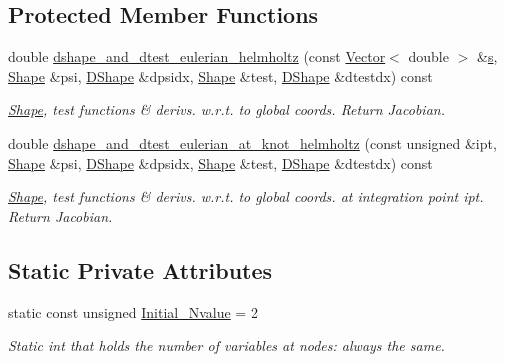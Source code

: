 \subsection*{Protected Member Functions}
\begin{DoxyCompactItemize}
\item 
double \hyperlink{classoomph_1_1QPMLHelmholtzElement_a0d5e590e5bd51ba8d2331c6fdced4653}{dshape\+\_\+and\+\_\+dtest\+\_\+eulerian\+\_\+helmholtz} (const \hyperlink{classoomph_1_1Vector}{Vector}$<$ double $>$ \&\hyperlink{cfortran_8h_ab7123126e4885ef647dd9c6e3807a21c}{s}, \hyperlink{classoomph_1_1Shape}{Shape} \&psi, \hyperlink{classoomph_1_1DShape}{D\+Shape} \&dpsidx, \hyperlink{classoomph_1_1Shape}{Shape} \&test, \hyperlink{classoomph_1_1DShape}{D\+Shape} \&dtestdx) const
\begin{DoxyCompactList}\small\item\em \hyperlink{classoomph_1_1Shape}{Shape}, test functions \& derivs. w.\+r.\+t. to global coords. Return Jacobian. \end{DoxyCompactList}\item 
double \hyperlink{classoomph_1_1QPMLHelmholtzElement_a89c593f771124ccb6e70b5abac7f709b}{dshape\+\_\+and\+\_\+dtest\+\_\+eulerian\+\_\+at\+\_\+knot\+\_\+helmholtz} (const unsigned \&ipt, \hyperlink{classoomph_1_1Shape}{Shape} \&psi, \hyperlink{classoomph_1_1DShape}{D\+Shape} \&dpsidx, \hyperlink{classoomph_1_1Shape}{Shape} \&test, \hyperlink{classoomph_1_1DShape}{D\+Shape} \&dtestdx) const
\begin{DoxyCompactList}\small\item\em \hyperlink{classoomph_1_1Shape}{Shape}, test functions \& derivs. w.\+r.\+t. to global coords. at integration point ipt. Return Jacobian. \end{DoxyCompactList}\end{DoxyCompactItemize}
\subsection*{Static Private Attributes}
\begin{DoxyCompactItemize}
\item 
static const unsigned \hyperlink{classoomph_1_1QPMLHelmholtzElement_a8f24b9dba63db870ee2760913ad8af50}{Initial\+\_\+\+Nvalue} = 2
\begin{DoxyCompactList}\small\item\em Static int that holds the number of variables at nodes\+: always the same. \end{DoxyCompactList}\end{DoxyCompactItemize}
